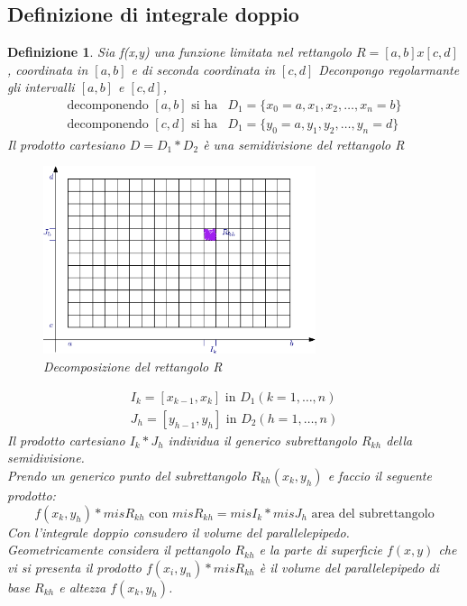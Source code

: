 \documentclass{book}
\newtheorem{defi}{Definizione}
\begin{document}
\subsection{Definizione di integrale doppio}
\begin{defi}
  Sia f(x,y) una funzione limitata nel rettangolo $R=[a,b]x[c,d]$, coordinata in $[a,b]$ e
  di seconda coordinata in $[c,d]$
  Deconpongo regolarmante gli intervalli $[a,b]$ e $[c,d]$,
  \begin{equation*}
    \begin{matrix}
        \text{decomponendo }[a,b]\text{ si ha} & D_1=\{x_0=a,x_1,x_2,\dots,x_n=b\}\\ 
        \text{decomponendo }[c,d]\text{ si ha} & D_1=\{y_0=a,y_1,y_2,\dots,y_n=d\}
    \end{matrix}
  \end{equation*}
  Il prodotto cartesiano $D=D_1*D_2$ è una semidivisione del rettangolo R
  \begin{figure}[ht]
    \centering
    \includegraphics[width=8cm]{img/finiti/graficodecomposizioneR.eps}
    \caption{Decomposizione del rettangolo R}
  \end{figure}
  \begin{equation*}
    \begin{matrix}
        I_k=[x_{k-1},x_k] \text{ in } D_1 (k=1,\dots,n)\\
        J_h=[y_{h-1},y_h] \text{ in } D_2 (h=1,\dots,n)
    \end{matrix}
  \end{equation*}
  Il prodotto cartesiano $I_k*J_h$ individua il generico subrettangolo $R_{kh}$ della semidivisione.\\
  Prendo un generico punto del subrettangolo $R_{kh}(x_k,y_h)$ e faccio il seguente prodotto:
  \begin{equation*}
    f(x_k,y_h)*mis R_{kh} \text{ con } misR_{kh} = misI_k * misJ_h \text{ area del subrettangolo}
  \end{equation*}
  Con l'integrale doppio consudero il volume del parallelepipedo.\\
  Geometricamente considera il pettangolo $R_{kh}$ e la parte di superficie $f(x,y)$ che vi si
  presenta il prodotto $f(x_i,y_n)*mis R_{kh}$ è il volume del parallelepipedo di base $R_{kh}$
  e altezza $f(x_k,y_h)$.
\end{defi}
\end{document}
